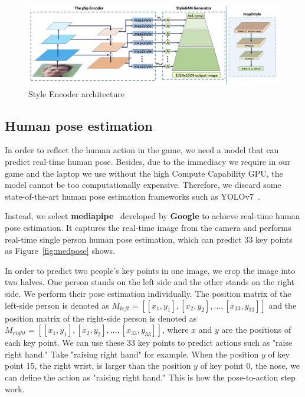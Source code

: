\begin{figure}[ht]
    \centering
    \includegraphics[scale=.5]{fig/pixel2style2pixel_pipeline.png}
    \caption{Style Encoder architecture}
    \label{fig:styleEncoder}
\end{figure}


\subsection{Human pose estimation} \label{HPE}

In order to reflect the human action in the game, we need a model that can predict real-time human pose. Besides, due to the immediacy we require in our game and the laptop we use without the high Compute Capability GPU, the model cannot be too computationally expensive. Therefore, we discard some state-of-the-art human pose estimation frameworks such as YOLOv7~\cite{wang2022yolov7}. 

\label{mediapipework}
Instead, we select \textbf{mediapipe}~\cite{lugaresi2019mediapipe} developed by \textbf{Google} to achieve real-time human pose estimation. It captures the real-time image from the camera and performs real-time single person human pose estimation, which can predict 33 key points as Figure~\ref{fig:medpose} shows.

In order to predict two people's key points in one image, we crop the image into two halves. One person stands on the left side and the other stands on the right side. We perform their pose estimation individually. The position matrix of the left-side person is denoted as $M_{left}=[[x_1, y_1],[x_2, y_2],...,[x_{33}, y_{33}]]$ and the position matrix of the right-side person is denoted as $M_{right}=[[x_1, y_1],[x_2, y_2],...,[x_{33}, y_{33}]]$, where $x$ and $y$ are the positions of each key point. We can use these 33 key points to predict actions such as "raise right hand." Take "raising right hand" for example. When the position $y$ of key point 15, the right wrist, is larger than the position $y$ of key point 0, the nose, we can define the action as "raising right hand." This is how the pose-to-action step work.


